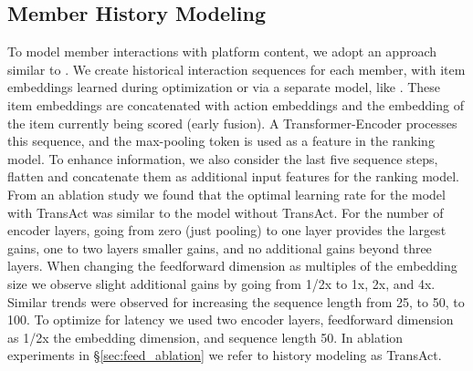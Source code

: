 \subsection{Member History Modeling}\label{sec:trans_act}
To model member interactions with platform content, we adopt an approach similar to \cite{xia2023transact, chen2019behavior}. We create historical interaction sequences for each member, with item embeddings learned during optimization or via a separate model, like \cite{pancha2022pinnerformer}. These item embeddings are concatenated with action embeddings and the embedding of the item currently being scored (early fusion). A Transformer-Encoder \cite{vaswani2017attention} processes this sequence, and the max-pooling token is used as a feature in the ranking model. To enhance information, we also consider the last five sequence steps, flatten and concatenate them as additional input features for the ranking model.
From an ablation study we found that the optimal learning rate for the model with TransAct was similar to the model without TransAct. For the number of encoder layers, going from zero (just pooling) to one layer provides the largest gains, one to two layers smaller gains, and no additional gains beyond three layers. When changing the feedforward dimension as multiples of the embedding size we observe slight additional gains by going from 1/2x to 1x, 2x, and 4x. Similar trends were observed for increasing the sequence length from 25, to 50, to 100. To optimize for latency we used two encoder layers, feedforward dimension as 1/2x the embedding dimension, and sequence length 50. In ablation experiments in \S\ref{sec:feed_ablation} we refer to history modeling as TransAct.
